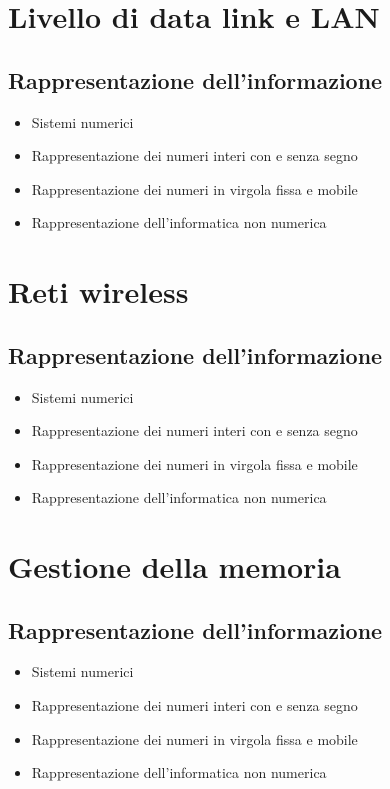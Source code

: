 \documentclass[10pt, a4paper, openany]{book}
\begin{document}
\chapter{Livello di data link e LAN}
\section{Rappresentazione dell'informazione}
\begin{itemize}
    \item Sistemi numerici
    \item Rappresentazione dei numeri interi con e senza segno
    \item Rappresentazione dei numeri in virgola fissa e mobile
    \item Rappresentazione dell'informatica non numerica
\end{itemize}

\chapter{Reti wireless}
\section{Rappresentazione dell'informazione}
\begin{itemize}
    \item Sistemi numerici
    \item Rappresentazione dei numeri interi con e senza segno
    \item Rappresentazione dei numeri in virgola fissa e mobile
    \item Rappresentazione dell'informatica non numerica
\end{itemize}

\chapter{Gestione della memoria}
\section{Rappresentazione dell'informazione}
\begin{itemize}
    \item Sistemi numerici
    \item Rappresentazione dei numeri interi con e senza segno
    \item Rappresentazione dei numeri in virgola fissa e mobile
    \item Rappresentazione dell'informatica non numerica
\end{itemize}
\end{document}
